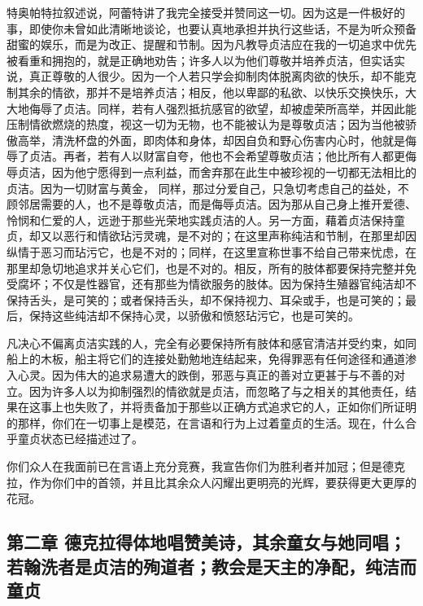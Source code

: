 特奥帕特拉叙述说，阿蕾特讲了我完全接受并赞同这一切。因为这是一件极好的事，即使你未曾如此清晰地谈论，也要认真地承担并执行这些话，不是为听众预备甜蜜的娱乐，而是为改正、提醒和节制。因为凡教导贞洁应在我的一切追求中优先被看重和拥抱的，就是正确地劝告；许多人以为他们尊敬并培养贞洁，但实话实说，真正尊敬的人很少。因为一个人若只学会抑制肉体脱离肉欲的快乐，却不能克制其余的情欲，那并不是培养贞洁；相反，他以卑鄙的私欲、以快乐交换快乐，大大地侮辱了贞洁。同样，若有人强烈抵抗感官的欲望，却被虚荣所高举，并因此能压制情欲燃烧的热度，视这一切为无物，也不能被认为是尊敬贞洁；因为当他被骄傲高举，清洗杯盘的外面，即肉体和身体，却因自负和野心伤害内心时，他就是侮辱了贞洁。再者，若有人以财富自夸，他也不会希望尊敬贞洁；他比所有人都更侮辱贞洁，因为他宁愿得到一点利益，而舍弃那在此生中被珍视的一切都无法相比的贞洁。因为一切财富与黄金，  同样，那过分爱自己，只急切考虑自己的益处，不顾邻居需要的人，也不是尊敬贞洁，而是侮辱贞洁。因为那从自己身上推开爱德、怜悯和仁爱的人，远逊于那些光荣地实践贞洁的人。另一方面，藉着贞洁保持童贞，却又以恶行和情欲玷污灵魂，是不对的；在这里声称纯洁和节制，在那里却因纵情于恶习而玷污它，也是不对的；同样，在这里宣称世事不给自己带来忧虑，在那里却急切地追求并关心它们，也是不对的。相反，所有的肢体都要保持完整并免受腐坏；不仅是性器官，还有那些为情欲服务的肢体。因为保持生殖器官纯洁却不保持舌头，是可笑的；或者保持舌头，却不保持视力、耳朵或手，也是可笑的；最后，保持这些纯洁却不保持心灵，以骄傲和愤怒玷污它，也是可笑的。\par

凡决心不偏离贞洁实践的人，完全有必要保持所有肢体和感官清洁并受约束，如同船上的木板，船主将它们的连接处勤勉地连结起来，免得罪恶有任何途径和通道渗入心灵。因为伟大的追求易遭大的跌倒，邪恶与真正的善对立更甚于与不善的对立。因为许多人以为抑制强烈的情欲就是贞洁，而忽略了与之相关的其他责任，结果在这事上也失败了，并将责备加于那些以正确方式追求它的人，正如你们所证明的那样，你们在一切事上是模范，在言语和行为上过着童贞的生活。现在，什么合乎童贞状态已经描述过了。\par

你们众人在我面前已在言语上充分竞赛，我宣告你们为胜利者并加冠；但是德克拉，作为你们中的首领，并且比其余众人闪耀出更明亮的光辉，要获得更大更厚的花冠。\par


\subsection{第二章  德克拉得体地唱赞美诗，其余童女与她同唱；若翰洗者是贞洁的殉道者；教会是天主的净配，纯洁而童贞}

